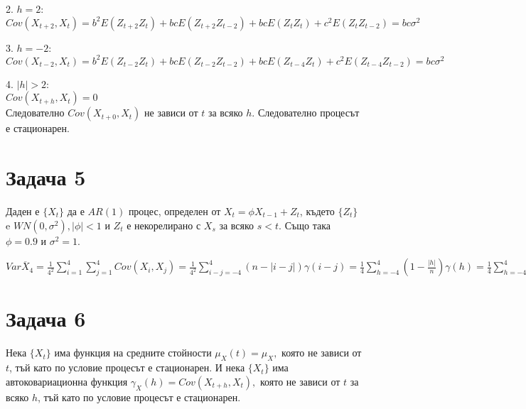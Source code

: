 \documentclass{article}
\begin{document}
\begin{flushleft}
\begin{flushleft}
\begin{flushleft}
2. $h = 2$: \\
$Cov(X_{t+2}, X_t) = b^2E(Z_{t+2}Z_t) + bcE(Z_{t+2}Z_{t-2}) + bcE(Z_{t}Z_t) + c^2E(Z_{t}Z_{t-2}) = bc\sigma^2$
\end{flushleft}

\begin{flushleft}
3. $h = -2$: \\
$Cov(X_{t-2}, X_t) = b^2E(Z_{t-2}Z_t) + bcE(Z_{t-2}Z_{t-2}) + bcE(Z_{t-4}Z_t) + c^2E(Z_{t-4}Z_{t-2}) = bc\sigma^2$
\end{flushleft}

\begin{flushleft}
4. $|h| > 2$: \\
$Cov(X_{t+h}, X_t) = 0$ \\
Следователно $Cov(X_{t+0}, X_t)$ не зависи от $t$ за всяко $h$. Следователно процесът е стационарен.
\end{flushleft}

\end{flushleft}

\section*{Задача 5}
\begin{flushleft}
Даден е $\{X_t \}$ да е $AR(1)$ процес, определен от $X_t = \phi X_{t-1} + Z_t$, където $\{Z_t \}$ e $WN(0, \sigma^2), |\phi| < 1$ и $Z_t$ е некорелирано с $X_s$ за всяко $s < t$. Също така $\phi = 0.9$ и $\sigma^2 = 1$. \\
\end{flushleft}
\begin{flushleft}
$Var \overline{X}_4 = \frac{1}{4^2} \sum_{i=1}^{4} \sum_{j=1}^{4} Cov(X_i, X_j) = \frac{1}{4^2} \sum_{i-j=-4}^{4} (n - |i - j|)\gamma(i-j) = \frac{1}{4} \sum_{h=-4}^{4} (1 - \frac{|h|}{n})\gamma(h) = \frac{1}{4} \sum_{h=-4}^{4} (1 - \frac{|h|}{4}) \frac{\phi^{|h|} \sigma^2}{1 - \phi^2}$
\end{flushleft}

\section*{Задача 6}
\begin{flushleft}
Нека $\{X_t \}$ има функция на средните стойности $\mu_X(t) = \mu_X,$ която не зависи от $t$, тъй като по условие процесът е стационарен. И нека $\{X_t \}$ има автоковариационна функция $\gamma_X(h) = Cov(X_{t+h}, X_{t}),$ която не зависи от $t$ за всяко $h$, тъй като по условие процесът е стационарен.


\end{flushleft}
\end{flushleft}
\end{document}
